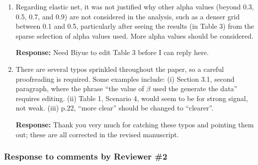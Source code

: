 \documentclass[12]{article}
\newcommand{\re}{\textbf{Response: }}
\newcommand\pb[1]{{\color{red}#1}}
\begin{document}
\begin{enumerate}[align = left]
  \re Thank you for the suggestion; we now mention the precision lasso method in the discussion section.

\item Regarding elastic net, it was not justified why other alpha values (beyond 0.3, 0.5, 0.7, and 0.9) are not considered in the analysis, such as a denser grid between 0.1 and 0.5, particularly after seeing the results (in Table 3) from the sparse selection of alpha values used. More alpha values should be considered.

  \re \pb{Need Biyue to edit Table 3 before I can reply here.}

\item There are several typos sprinkled throughout the paper, so a careful proofreading is required. Some examples include: (i) Section 3.1, second paragraph, where the phrase ``the value of $\beta$ used the generate the data'' requires editing. (ii) Table 1, Scenario 4, would seem to be for strong signal, not weak. (iii) p.22, ``more clear'' should be changed to ``clearer''.

  \re Thank you very much for catching these typos and pointing them out; these are all corrected in the revised manuscript.

\end{enumerate}

\newpage

\subsubsection*{Response to comments by Reviewer \#2}
\end{document}
